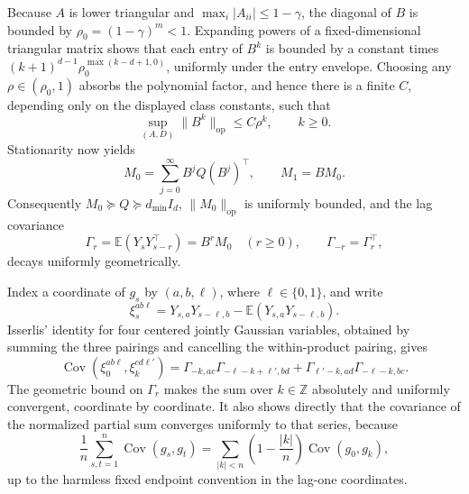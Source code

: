 Because \(A\) is lower triangular and \(\max_i|A_{ii}|\le1-\gamma\), the diagonal of \(B\) is bounded by \(\rho_0=(1-\gamma)^m<1\).  Expanding powers of a fixed-dimensional triangular matrix shows that each entry of \(B^k\) is bounded by a constant times \((k+1)^{d-1}\rho_0^{\max(k-d+1,0)}\), uniformly under the entry envelope.  Choosing any \(\rho\in(\rho_0,1)\) absorbs the polynomial factor, and hence there is a finite \(C\), depending only on the displayed class constants, such that
\[
 \sup_{(A,D)}\|B^k\|_{\mathrm{op}}\le C\rho^k,\qquad k\ge0.
\]
Stationarity now yields
\[
 M_0=\sum_{j=0}^{\infty}B^jQ(B^j)^\top,\qquad
 M_1=BM_0.
\]
Consequently \(M_0\succeq Q\succeq d_{\min}I_d\), \(\|M_0\|_{\mathrm{op}}\) is uniformly bounded, and the lag covariance
\[
 \Gamma_r=\mathbb E(Y_sY_{s-r}^\top)
 =B^rM_0\quad(r\ge0),\qquad \Gamma_{-r}=\Gamma_r^\top,
\]
decays uniformly geometrically.

Index a coordinate of \(g_s\) by \((a,b,\ell)\), where \(\ell\in\{0,1\}\), and write
\[
 \xi_s^{a b\ell}=Y_{s,a}Y_{s-\ell,b}-\mathbb E(Y_{s,a}Y_{s-\ell,b}).
\]
Isserlis' identity for four centered jointly Gaussian variables, obtained by summing the three pairings and cancelling the within-product pairing, gives
\[
 \operatorname{Cov}(\xi_0^{ab\ell},\xi_k^{cd\ell'})
 =\Gamma_{-k,ac}\Gamma_{-\ell-k+\ell',bd}
  +\Gamma_{\ell'-k,ad}\Gamma_{-\ell-k,bc}.
\]
The geometric bound on \(\Gamma_r\) makes the sum over \(k\in\mathbb Z\) absolutely and uniformly convergent, coordinate by coordinate.  It also shows directly that the covariance of the normalized partial sum converges uniformly to that series, because
\[
 \frac1n\sum_{s,t=1}^{n}\operatorname{Cov}(g_s,g_t)
 =\sum_{|k|<n}\left(1-\frac{|k|}{n}\right)\operatorname{Cov}(g_0,g_k),
\]
up to the harmless fixed endpoint convention in the lag-one coordinates.

